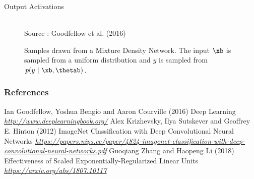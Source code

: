 \begin{frame} {Output Activations}
  \begin{figure}
    \centering
      \tiny{\\ Source : Goodfellow et al. (2016)}
      \caption{\footnotesize Samples drawn from a Mixture Density Network. The input $\xb$ is sampled from a uniform distribution and $y$ is sampled from $p(y~|~\xb,\thetab)$.}
  \end{figure}
\end{frame}

\begin{vbframe}
\frametitle{References}
\footnotesize{
\begin{thebibliography}{99}
 Ian Goodfellow, Yoshua Bengio and Aaron Courville (2016)
\newblock Deep Learning
\newblock \emph{\url{http://www.deeplearningbook.org/}}
 Alex Krizhevsky, Ilya Sutskever and Geoffrey E. Hinton (2012)
\newblock ImageNet Classification with Deep Convolutional Neural Networks
\newblock \emph{\url{https://papers.nips.cc/paper/4824-imagenet-classification-with-deep-convolutional-neural-networks.pdf}}
 Guoqiang Zhang and Haopeng Li (2018)
\newblock Effectiveness of Scaled Exponentially-Regularized Linear Units 
\newblock \emph{\url{https://arxiv.org/abs/1807.10117}}
\end{thebibliography}
}
\end{vbframe}

\endlecture
